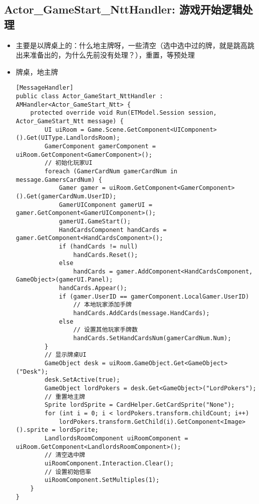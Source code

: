 \documentclass[9pt, b5paper]{article}
\begin{document}
\subsection{Actor\_GameStart\_NttHandler: 游戏开始逻辑处理}
\label{sec-1-7}
\begin{itemize}
\item 主要是以牌桌上的：什么地主牌呀，一些清空（选中选中过的牌，就是跳高跳出来准备出的，为什么先前没有处理？），重置，等预处理
\item 牌桌，地主牌
\begin{verbatim}
[MessageHandler]
public class Actor_GameStart_NttHandler : AMHandler<Actor_GameStart_Ntt> {
    protected override void Run(ETModel.Session session, Actor_GameStart_Ntt message) {
        UI uiRoom = Game.Scene.GetComponent<UIComponent>().Get(UIType.LandlordsRoom);
        GamerComponent gamerComponent = uiRoom.GetComponent<GamerComponent>();
        // 初始化玩家UI
        foreach (GamerCardNum gamerCardNum in message.GamersCardNum) {
            Gamer gamer = uiRoom.GetComponent<GamerComponent>().Get(gamerCardNum.UserID);
            GamerUIComponent gamerUI = gamer.GetComponent<GamerUIComponent>();
            gamerUI.GameStart();
            HandCardsComponent handCards = gamer.GetComponent<HandCardsComponent>();
            if (handCards != null) 
                handCards.Reset();
            else 
                handCards = gamer.AddComponent<HandCardsComponent, GameObject>(gamerUI.Panel);
            handCards.Appear();
            if (gamer.UserID == gamerComponent.LocalGamer.UserID) 
                // 本地玩家添加手牌
                handCards.AddCards(message.HandCards);
            else 
                // 设置其他玩家手牌数
                handCards.SetHandCardsNum(gamerCardNum.Num);
        }
        // 显示牌桌UI
        GameObject desk = uiRoom.GameObject.Get<GameObject>("Desk");
        desk.SetActive(true);
        GameObject lordPokers = desk.Get<GameObject>("LordPokers");
        // 重置地主牌
        Sprite lordSprite = CardHelper.GetCardSprite("None");
        for (int i = 0; i < lordPokers.transform.childCount; i++) 
            lordPokers.transform.GetChild(i).GetComponent<Image>().sprite = lordSprite;
        LandlordsRoomComponent uiRoomComponent = uiRoom.GetComponent<LandlordsRoomComponent>();
        // 清空选中牌
        uiRoomComponent.Interaction.Clear();
        // 设置初始倍率
        uiRoomComponent.SetMultiples(1);
    }
}
\end{verbatim}
\end{itemize}
\end{document}
